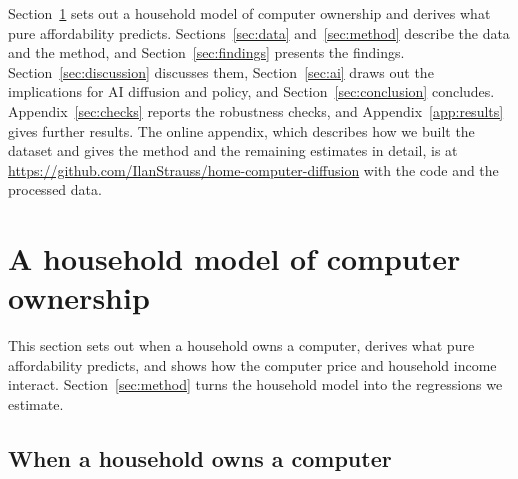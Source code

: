 \documentclass[11pt]{article}
\begin{document}
Section~\ref{sec:model} sets out a household model of computer ownership and derives what pure affordability predicts. Sections~\ref{sec:data} and~\ref{sec:method} describe the data and the method, and Section~\ref{sec:findings} presents the findings. Section~\ref{sec:discussion} discusses them, Section~\ref{sec:ai} draws out the implications for AI diffusion and policy, and Section~\ref{sec:conclusion} concludes. Appendix~\ref{sec:checks} reports the robustness checks, and Appendix~\ref{app:results} gives further results. The online appendix, which describes how we built the dataset and gives the method and the remaining estimates in detail, is at \url{https://github.com/IlanStrauss/home-computer-diffusion} with the code and the processed data.

\section{A household model of computer ownership}
\label{sec:model}

This section sets out when a household owns a computer, derives what pure affordability predicts, and shows how the computer price and household income interact. Section~\ref{sec:method} turns the household model into the regressions we estimate.

\subsection{When a household owns a computer}
\end{document}
